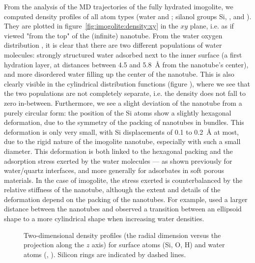 \documentclass[thesis]{subfiles}
\begin{document}
From the analysis of the MD trajectories of the fully hydrated imogolite, we
computed density profiles of all atom types (water  and ;
silanol groups Si, , and ). They are plotted in
figure~\ref{fig:imogolite:density:xy} in the $xy$ plane, i.e. as if viewed "from the
top" of the (infinite) nanotube. From the water oxygen distribution ,
it is clear that there are two different populations of water molecules:
strongly structured water adsorbed next to the inner surface (a first hydration
layer, at distances between 4.5 and \SI{5.8}{\AA} from the nanotube's center), and
more disordered water filling up the center of the nanotube. This is also
clearly visible in the cylindrical distribution functions (figure \TODO), where we
see that the two populations are not completely separate, i.e. the density does
not fall to zero in-between. Furthermore, we see a slight deviation of the
nanotube from a purely circular form: the position of the Si atoms show a
slightly hexagonal deformation, due to the symmetry of the packing of nanotubes
in bundles\cite{Amara2014}. This deformation is only very
small, with Si displacements of 0.1 to \SI{0.2}{\AA} at most, due to the rigid
nature of the imogolite nanotube, especially with such a small diameter.  This
deformation is both linked to the hexagonal packing and the adsorption stress
exerted by the water molecules --- as shown previously for water/quartz
interfaces\cite{Gor2016}, and more generally for adsorbates in soft porous
materials\cite{Neimark2009, Mouhat2015}. In the case of imogolite, the stress
exerted is counterbalanced by the relative stiffness of the nanotube, although
the extent and details of the deformation depend on the packing of the
nanotubes. For example\citeauthor{Creton2008}\cite{Creton2008}, used a
larger distance between the nanotubes and observed a transition between an
ellipsoid shape to a more cylindrical shape when increasing water densities.

\begin{figure}[t]
    \centering
    
    \caption{Two-dimensional density profiles (the radial dimension versus the
    projection along the $z$ axis) for surface atoms (Si, O, H) and water atoms
    (, ). Silicon rings are indicated by dashed lines.}
    \label{fig:imogolite:density:rz}
\end{figure}
\end{document}
